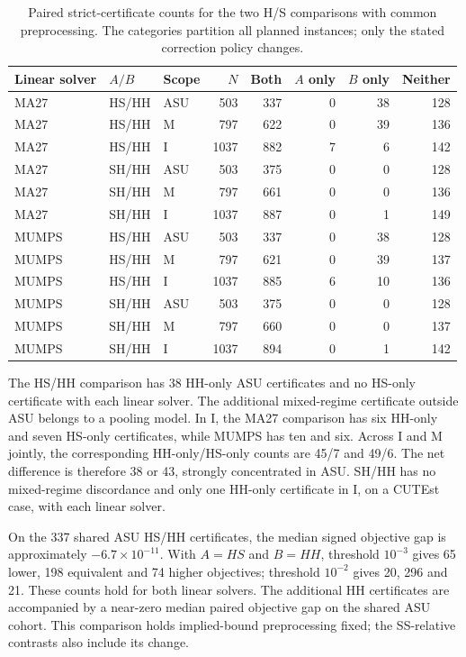 \documentclass[pdflatex,sn-mathphys-num]{sn-jnl}
\theoremstyle{thmstyleone}
\theoremstyle{thmstylethree}
\begin{document}
\begin{table}[t]
\centering\small
\caption{Paired strict-certificate counts for the two H/S comparisons with
common preprocessing. The categories partition all planned instances;
only the stated correction policy changes.}
\label{tab:quartet-clean-edge-coverage}

\begin{tabular}{@{}lllrrrrr@{}}
\toprule
Linear solver & $A/B$ & Scope & $N$ & Both & $A$ only & $B$ only & Neither\\
\midrule
MA27 & HS/HH & ASU & 503 & 337 & 0 & 38 & 128\\
MA27 & HS/HH & M & 797 & 622 & 0 & 39 & 136\\
MA27 & HS/HH & I & 1037 & 882 & 7 & 6 & 142\\
MA27 & SH/HH & ASU & 503 & 375 & 0 & 0 & 128\\
MA27 & SH/HH & M & 797 & 661 & 0 & 0 & 136\\
MA27 & SH/HH & I & 1037 & 887 & 0 & 1 & 149\\
MUMPS & HS/HH & ASU & 503 & 337 & 0 & 38 & 128\\
MUMPS & HS/HH & M & 797 & 621 & 0 & 39 & 137\\
MUMPS & HS/HH & I & 1037 & 885 & 6 & 10 & 136\\
MUMPS & SH/HH & ASU & 503 & 375 & 0 & 0 & 128\\
MUMPS & SH/HH & M & 797 & 660 & 0 & 0 & 137\\
MUMPS & SH/HH & I & 1037 & 894 & 0 & 1 & 142\\
\bottomrule
\end{tabular}


\end{table}

The HS/HH comparison has 38 HH-only ASU certificates and no HS-only certificate
with each linear solver. The additional mixed-regime certificate outside
ASU belongs to a pooling model. In I, the MA27 comparison has six HH-only and
seven HS-only certificates, while MUMPS has ten and six. Across I and M
jointly, the corresponding HH-only/HS-only counts are 45/7 and 49/6.
The net difference is therefore 38 or 43, strongly concentrated in ASU.
SH/HH has no mixed-regime discordance and only one HH-only certificate
in I, on a CUTEst case, with each linear solver.

On the 337 shared ASU HS/HH certificates, the median signed objective
gap is approximately $-6.7\times10^{-11}$. With $A=HS$ and $B=HH$,
threshold $10^{-3}$ gives 65 lower, 198 equivalent and 74 higher
objectives; threshold $10^{-2}$ gives 20, 296 and 21. These counts hold
for both linear solvers. The additional HH certificates are accompanied by a near-zero median
paired objective gap on the shared ASU cohort. This comparison holds
implied-bound preprocessing fixed; the SS-relative contrasts also include
its change.
\end{document}
